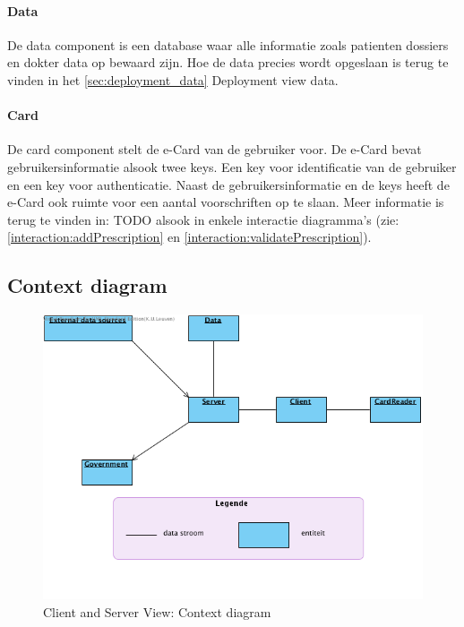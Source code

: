 \documentclass[a4paper,10pt]{article}
\begin{document}
\paragraph{Data}
De data component is een database waar alle informatie zoals patienten dossiers en dokter data op bewaard zijn.  Hoe de data precies wordt opgeslaan is terug te vinden in het \ref{sec:deployment_data} Deployment view data.

\paragraph{Card}
De card component stelt de e-Card van de gebruiker voor.  De e-Card bevat gebruikersinformatie alsook twee keys.  Een key voor identificatie van de gebruiker en een key voor authenticatie.  Naast de gebruikersinformatie en de keys heeft de e-Card ook ruimte voor een aantal voorschriften op te slaan.  Meer informatie is terug te vinden in: TODO alsook in enkele interactie diagramma's (zie: \ref{interaction:addPrescription} en \ref{interaction:validatePrescription}).

\subsection{Context diagram}

\begin{figure}[!ht]
  \includegraphics[width=\textwidth]{../images/ClientServer_Context.png}
  \caption{Client and Server View: Context diagram}
\end{figure}
\end{document}

